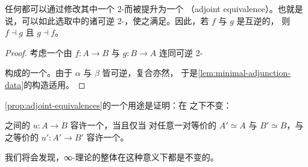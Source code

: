 \begin{proposition}[\trAdjointEquivalence]\label{prop:adjoint-equivalences}

任何\trEquivalence{}都可以通过修改其中一个 2-\trCell{}而被提升为一个\textbf{\trAdjointEquivalence}
（adjoint equivalence）。也就是说，可以如此选取\trEquivalence{}中的诸可逆
2-\trCell{}，使之满足\trTriangleEqualities{}。因此，若 $f$ 与 $g$ 是互逆的\trEquivalence{}，
则 $f\dashv g$ 且 $g\dashv f$。
\end{proposition}
\begin{proof}
考虑一个由\trFunctor{} $f\colon A\to B$ 与 $g\colon B\to A$ 连同可逆 2-\trCell{}
\begin{center}
\end{center}
构成的一个\trEquivalence{}。由于 $\alpha$ 与 $\beta$ 皆可逆，\trTriangleEqualities{}复合亦然，
于是\cref{lem:minimal-adjunction-data}的构造适用。
\end{proof}

\cref{prop:adjoint-equivalences}的一个用途是证明：\trAdjunction{}在\trEquivalence{}%
之下不变：

\begin{proposition}\label{prop:adjunction-equivalence-invariant}
\trInfinityCategory{}之间的\trFunctor{} $u\colon A\to B$ 容许一个\trLeftAdjoint{}，当且仅当
对任意一对等价的\trInfinityCategory{} $A'\simeq A$ 与 $B'\simeq B$，与之等价的%
\trFunctor{} $u'\colon A'\to B'$ 容许一个\trLeftAdjoint{}。
\end{proposition}

我们将会发现，∞-\trCategory{}理论的整体在这种意义下都是\trEquivalence{}不变的。

